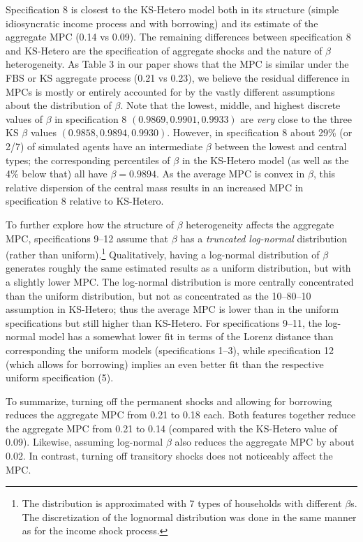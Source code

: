 \documentclass[11pt,a4paper,pdftex]{article}\usepackage[pdftex]{graphicx}\usepackage{epstopdf} \usepackage[pdftex]{hyperref}
\begin{document}
Specification 8 is closest to the KS-Hetero model both in its structure (simple idiosyncratic income process and with borrowing) and its estimate of the aggregate MPC (0.14 vs 0.09).  The remaining differences between specification 8 and KS-Hetero are the specification of aggregate shocks and the nature of $\beta$ heterogeneity.  As Table 3 in our paper shows that the MPC is similar under the FBS or KS aggregate process (0.21 vs 0.23), we believe the residual difference in MPCs is mostly or entirely accounted for by the vastly different assumptions about the distribution of $\beta$.  Note that the lowest, middle, and highest discrete values of $\beta$ in specification 8 $(0.9869,0.9901,0.9933)$ are \textit{very} close to the three KS $\beta$ values $(0.9858,0.9894,0.9930)$.  However, in specification 8 about 29\% (or 2/7) of simulated agents have an intermediate $\beta$ between the lowest and central types; the corresponding percentiles of $\beta$ in the KS-Hetero model (as well as the 4\% below that) all have $\beta=0.9894$.  As the average MPC is convex in $\beta$, this relative dispersion of the central mass results in an increased MPC in specification 8 relative to KS-Hetero.

To further explore how the structure of $\beta$ heterogeneity affects the aggregate MPC, specifications 9--12 assume that $\beta$ has a \emph{truncated log-normal} distribution (rather than uniform).\footnote{The distribution is approximated with 7 types of households with different $\beta$s.  The discretization of the lognormal distribution was done in the same manner as for the income shock process.} Qualitatively, having a log-normal distribution of $\beta$ generates roughly the same estimated results as a uniform distribution, but with a slightly lower MPC.  The log-normal distribution is more centrally concentrated than the uniform distribution, but not as concentrated as the 10--80--10 assumption in KS-Hetero; thus the average MPC is lower than in the uniform specifications but still higher than KS-Hetero. For specifications 9--11, the log-normal model has a somewhat lower fit in terms of the Lorenz distance than corresponding the uniform models (specifications 1--3), while specification 12 (which allows for borrowing) implies an even better fit than the respective uniform specification (5).

To summarize, turning off the permanent shocks and allowing for borrowing reduces the aggregate MPC from 0.21 to 0.18 each. Both features together reduce the aggregate MPC from 0.21 to 0.14 (compared with the KS-Hetero value of 0.09). Likewise, assuming log-normal $\beta$ also reduces the aggregate MPC by about 0.02.  In contrast, turning off transitory shocks does not noticeably affect the MPC.




\nocite{SSLifeTables}

\small


\end{document}
